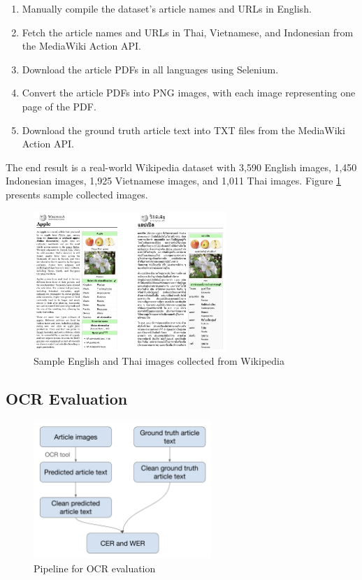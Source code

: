 \documentclass[12pt,oneside]{memoir}
\begin{document}
\begin{enumerate}
    \item Manually compile the dataset’s article names and URLs in English.
    \item Fetch the article names and URLs in Thai, Vietnamese, and Indonesian from the MediaWiki Action API.
    \item Download the article PDFs in all languages using Selenium.
    \item Convert the article PDFs into PNG images, with each image representing one page of the PDF.
    \item Download the ground truth article text into TXT files from the MediaWiki Action API.
\end{enumerate}

The end result is a real-world Wikipedia dataset with 3,590 English images, 1,450 Indonesian images, 1,925 Vietnamese images, and 1,011 Thai images.
Figure \ref{figure:real-world-data} presents sample collected images.

\begin{figure}[ht]
    \centering
    \includegraphics[width=0.65\textwidth]{images/real-world-data.png}
    \caption{Sample English and Thai images collected from Wikipedia}
    \label{figure:real-world-data}
\end{figure}

\subsection{OCR Evaluation} \label{section:ocr-evaluation}

\begin{figure}[ht]
    \centering
    \includegraphics[width=0.6\textwidth]{images/ocr-evaluation.png}
    \caption{Pipeline for OCR evaluation}
    \label{figure:ocr-evaluation}
\end{figure}
\end{document}
